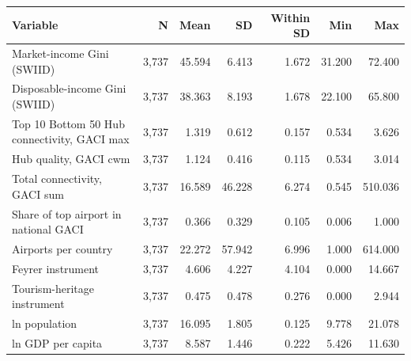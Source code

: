 \begin{tabular}{lrrrrrr}
\toprule
Variable & N & Mean & SD & Within SD & Min & Max \\
\midrule
Market-income Gini (SWIID) & 3,737 & 45.594 & 6.413 & 1.672 & 31.200 & 72.400 \\
Disposable-income Gini (SWIID) & 3,737 & 38.363 & 8.193 & 1.678 & 22.100 & 65.800 \\
Top 10%
Bottom 50%
Hub connectivity, GACI max & 3,737 & 1.319 & 0.612 & 0.157 & 0.534 & 3.626 \\
Hub quality, GACI cwm & 3,737 & 1.124 & 0.416 & 0.115 & 0.534 & 3.014 \\
Total connectivity, GACI sum & 3,737 & 16.589 & 46.228 & 6.274 & 0.545 & 510.036 \\
Share of top airport in national GACI & 3,737 & 0.366 & 0.329 & 0.105 & 0.006 & 1.000 \\
Airports per country & 3,737 & 22.272 & 57.942 & 6.996 & 1.000 & 614.000 \\
Feyrer instrument & 3,737 & 4.606 & 4.227 & 4.104 & 0.000 & 14.667 \\
Tourism-heritage instrument & 3,737 & 0.475 & 0.478 & 0.276 & 0.000 & 2.944 \\
ln population & 3,737 & 16.095 & 1.805 & 0.125 & 9.778 & 21.078 \\
ln GDP per capita & 3,737 & 8.587 & 1.446 & 0.222 & 5.426 & 11.630 \\
\bottomrule
\end{tabular}